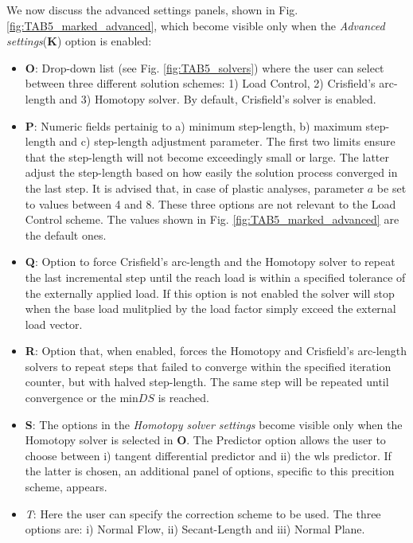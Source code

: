 \begin{appendices}
We now discuss the advanced settings panels, shown in Fig. 
\ref{fig:TAB5_marked_advanced}, which become visible only when the 
\textit{Advanced settings}(\textbf{K}) option is enabled:

\begin{itemize}
	\item \textbf{O}: Drop-down list (see Fig. \ref{fig:TAB5_solvers}) where 
	the user can select between three different solution schemes: 1) Load 
	Control, 2) Crisfield's arc-length and 3) Homotopy solver. By default, 
	Crisfield's solver is enabled. 
	\item \textbf{P}: Numeric fields pertainig to a) minimum step-length, b) 
	maximum step-length and c) step-length adjustment parameter. The first two 
	limits ensure that the step-length will not become exceedingly small or 
	large. The latter adjust the step-length based on how easily the solution 
	process converged in the last step. It is advised that, in case of plastic 
	analyses, parameter $a$ be set to values between 4 and 8. These three 
	options are not relevant to the Load Control scheme. The values shown in 
	Fig. \ref{fig:TAB5_marked_advanced} are the default ones.
	\item \textbf{Q}: Option to force Crisfield's arc-length and the Homotopy 
	solver to repeat the last incremental step until the reach load is within a 
	specified tolerance of the externally applied load. If this option is not 
	enabled the solver will stop when the base load mulitplied by the load 
	factor simply exceed the external load vector.
	\item \textbf{R}: Option that, when enabled, forces the Homotopy and 
	Crisfield's arc-length solvers to repeat steps that failed to converge 
	within the specified iteration counter, but with halved step-length. The 
	same step will be repeated until convergence or the min$DS$ is reached.
	\item \textbf{S}: The options in the \textit{Homotopy solver settings} 
	become visible only when the Homotopy solver is selected in \textbf{O}. The 
	Predictor option allows the user to choose between i) tangent differential 
	predictor and ii) the \acrshort{wls} predictor. If the latter is chosen, an 
	additional panel of options, specific to this precition scheme, appears.
	\item \textit{T}: Here the user can specify the correction scheme to be 
	used. The three options are: i) Normal Flow\cite{Watson:1989}, ii) 
	Secant-Length\cite{Schwetlick87} and iii) Normal Plane\cite{Riks:1979}.
	

\end{itemize}
\end{appendices}

